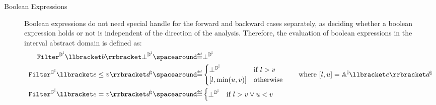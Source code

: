 \begin{description}
  \item[Boolean Expressions]
  Boolean expressions do not need special handle for the forward and backward cases separately, as deciding whether a boolean expression holds or not is independent of the direction of the analysis.
  Therefore, the evaluation of boolean expressions in the interval abstract domain is defined as:
  \begin{align*}
    \intervalabstractdomainfilter \semanticsof{\defbexp} \intervalabstractdomainbottom &\DefeQ \intervalabstractdomainbottom \\
    \intervalabstractdomainfilter \semanticsof{\defaexp \le \defvalue} \defabstractvalue &\DefeQ \begin{cases}
      \intervalabstractdomainbottom & \text{if } l > \defvalue \\
      \interval{l}{\min(u, \defvalue)} & \text{otherwise}
    \end{cases} \tag*{where $\interval{l}{u} = \intervalaexp \semanticsof{\defaexp} \defabstractvalue$} \\
    \intervalabstractdomainfilter \semanticsof{\defaexp = \defvalue} \defabstractvalue &\DefeQ \begin{cases}
      \intervalabstractdomainbottom & \text{if } l > \defvalue \lor u < \defvalue \\

\end{cases}
\end{align*}
\end{description}
